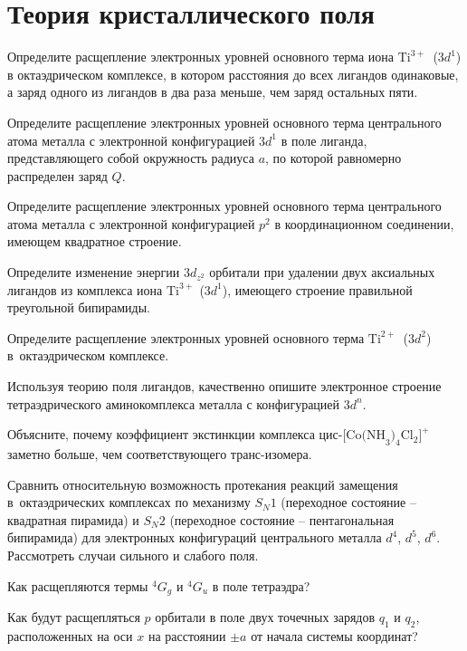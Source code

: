 \setmainfont{Noto Serif}
\setsansfont{Noto Sans}
\setmonofont{Noto Sans Mono}

\section{Теория кристаллического поля}
 Определите расщепление электронных уровней основного терма иона $\text{Ti}^{3+}$~($3d^1$) в октаэдрическом комплексе, в котором расстояния до всех лигандов одинаковые, а заряд одного из лигандов в два раза меньше, чем заряд остальных пяти.
\par
{} Определите расщепление электронных уровней основного терма центрального атома металла с электронной конфигурацией $3d^1$ в поле лиганда, представляющего собой окружность радиуса $a$, по которой равномерно распределен заряд $Q$.
\par
{} Определите расщепление электронных уровней основного терма центрального атома металла с электронной конфигурацией $p^2$ в координационном соединении, имеющем квадратное строение.
\par
{} Определите изменение энергии $3d_{z^2}$ орбитали при удалении двух аксиальных лигандов из комплекса иона $\text{Ti}^{3+}$ ($3d^1$), имеющего строение правильной треугольной бипирамиды.
\par
{} Определите расщепление электронных уровней основного терма $\text{Ti}^{2+}$~($3d^2$) в~октаэдрическом комплексе.
\par
{} Используя теорию поля лигандов, качественно опишите электронное строение тетраэдрического аминокомплекса металла с конфигурацией $3d^n$.
\par
{} Объясните, почему коэффициент экстинкции комплекса цис-$\text{[Co(NH}_3)_4\text{Cl}_2]^+$ заметно больше, чем соответствующего транс-изомера.
\par
{} Сравнить относительную возможность протекания реакций замещения в~октаэдрических комплексах по механизму $S_{N}1$ (переходное состояние – квадратная пирамида) и $S_{N}2$ (переходное состояние – пентагональная бипирамида) для электронных конфигураций центрального металла $d^4$, $d^5$, $d^6$. Рассмотреть случаи сильного и слабого поля.
\par
{} Как расщепляются термы $^4G_g$ и $^4G_u$ в поле тетраэдра?
\par
{} Как будут расщепляться $p$ орбитали в поле двух точечных зарядов $q_1$ и $q_2$, расположенных на оси $x$ на расстоянии $\pm a$ от начала системы координат?
